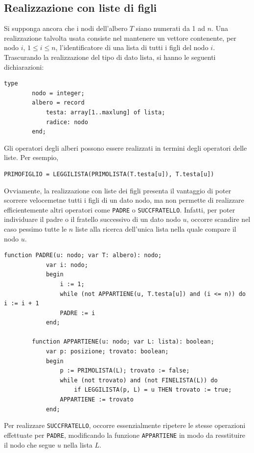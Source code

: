 \documentclass[12pt]{report}
\begin{document}
  \subsection{Realizzazione con liste di figli}
  Si supponga ancora che i nodi dell'albero $T$ siano numerati da 1 ad $n$. Una realizzazione talvolta usata consiste nel mantenere un vettore contenente, per nodo $i$, $1 \leq i \leq n$, l'identificatore di una lista di tutti i figli del nodo $i$. Trascurando la realizzazione del tipo di dato lista, si hanno le seguenti dichiarazioni:
  \begin{lstlisting}[style=pascalstyle]
  	type
  		nodo = integer;
  		albero = record
  			testa: array[1..maxlung] of lista;
  			radice: nodo
  		end;
  \end{lstlisting}
  Gli operatori degli alberi possono essere realizzati in termini degli operatori delle liste. Per esempio,
  \begin{lstlisting}[style=normalstyle]
  	PRIMOFIGLIO = LEGGILISTA(PRIMOLISTA(T.testa[u]), T.testa[u])\end{lstlisting}
  	Ovviamente, la realizzazione con liste dei figli presenta il vantaggio di poter scorrere velocemetne tutti i figli di un dato nodo, ma non permette di realizzare efficientemente altri operatori come \texttt{PADRE} o \texttt{SUCCFRATELLO}. Infatti, per poter individuare il padre o il fratello successivo di un dato nodo $u$, occorre scandire nel caso pessimo tutte le $n$ liste alla ricerca dell'unica lista nella quale compare il nodo $u$.
  	\begin{lstlisting}[style=pascalstyle]
  		function PADRE(u: nodo; var T: albero): nodo;
  			var i: nodo;
  			begin
  				i := 1;
  				while (not APPARTIENE(u, T.testa[u]) and (i <= n)) do i := i + 1
  				PADRE := i
  			end;

  		function APPARTIENE(u: nodo; var L: lista): boolean;
  			var p: posizione; trovato: boolean;
  			begin
  				p := PRIMOLISTA(L); trovato := false;
  				while (not trovato) and (not FINELISTA(L)) do
  					if LEGGILISTA(p, L) = u THEN trovato := true;
  				APPARTIENE := trovato
  			end;
  	\end{lstlisting}
  	Per realizzare \texttt{SUCCFRATELLO}, occorre essenzialmente ripetere le stesse operazioni effettuate per \texttt{PADRE}, modificando la funzione \texttt{APPARTIENE} in modo da resstituire il nodo che segue $u$ nella lista $L$.
\end{document}
